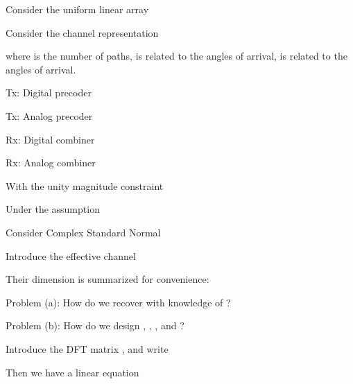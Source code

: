{
\I Consider the uniform linear array

\I Consider the channel representation

\I where  is the number of paths,  is related to the angles of arrival,  is related to the angles of arrival.
}
{
\I Tx: Digital precoder 

\I Tx: Analog precoder 

\I Rx: Digital combiner 

\I Rx: Analog combiner 

\I With the unity magnitude constraint

\I Under the assumption
}
{
\I Consider Complex Standard Normal 

\I Introduce the effective channel

\I Their dimension is summarized for convenience:

\I Problem (a): How do we recover  with knowledge of ?

\I Problem (b): How do we design , , , and ?
}
{
\I Introduce the DFT matrix , and write

\I Then we have a linear equation
}

